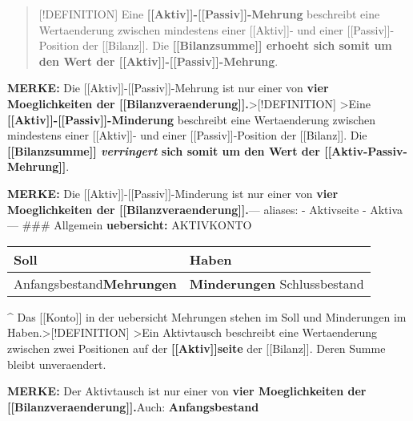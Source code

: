 \begin{quote}
{[}!DEFINITION{]} Eine
\textbf{{[}{[}Aktiv{]}{]}-{[}{[}Passiv{]}{]}-Mehrung} beschreibt eine
Wertaenderung zwischen mindestens einer {[}{[}Aktiv{]}{]}- und einer
{[}{[}Passiv{]}{]}-Position der {[}{[}Bilanz{]}{]}. Die
\textbf{{[}{[}Bilanzsumme{]}{]} erhoeht sich somit um den Wert der
{[}{[}Aktiv{]}{]}-{[}{[}Passiv{]}{]}-Mehrung}.
\end{quote}

\textbf{MERKE:} Die {[}{[}Aktiv{]}{]}-{[}{[}Passiv{]}{]}-Mehrung ist nur
einer von \textbf{vier Moeglichkeiten der
{[}{[}Bilanzveraenderung{]}{]}.}\textgreater{[}!DEFINITION{]}
\textgreater Eine
\textbf{{[}{[}Aktiv{]}{]}-{[}{[}Passiv{]}{]}-Minderung} beschreibt eine
Wertaenderung zwischen mindestens einer {[}{[}Aktiv{]}{]}- und einer
{[}{[}Passiv{]}{]}-Position der {[}{[}Bilanz{]}{]}. Die
\textbf{{[}{[}Bilanzsumme{]}{]} \emph{verringert} sich somit um den Wert
der {[}{[}Aktiv-Passiv-Mehrung{]}{]}}.

\textbf{MERKE:} Die {[}{[}Aktiv{]}{]}-{[}{[}Passiv{]}{]}-Minderung ist
nur einer von \textbf{vier Moeglichkeiten der
{[}{[}Bilanzveraenderung{]}{]}.}--- aliases: - Aktivseite - Aktiva ---
\#\#\# Allgemein \textbf{uebersicht:} AKTIVKONTO

\begin{longtable}[]{@{}ll@{}}
\toprule\noalign{}
Soll & Haben \\
\midrule\noalign{}
\endhead
\bottomrule\noalign{}
\endlastfoot
Anfangsbestand\textbf{Mehrungen} & \textbf{Minderungen}
Schlussbestand \\
\end{longtable}

\^{} Das {[}{[}Konto{]}{]} in der uebersicht Mehrungen stehen im Soll und
Minderungen im Haben.\textgreater{[}!DEFINITION{]} \textgreater Ein
Aktivtausch beschreibt eine Wertaenderung zwischen zwei Positionen auf
der \textbf{{[}{[}Aktiv{]}{]}seite} der {[}{[}Bilanz{]}{]}. Deren Summe
bleibt unveraendert.

\textbf{MERKE:} Der Aktivtausch ist nur einer von \textbf{vier
Moeglichkeiten der {[}{[}Bilanzveraenderung{]}{]}.}Auch:
\textbf{Anfangsbestand}

